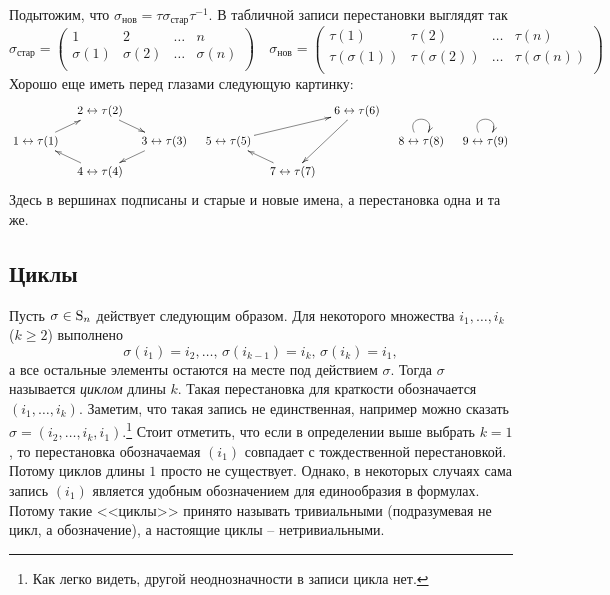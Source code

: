 Подытожим, что $\sigma_\text{нов}=\tau\sigma_\text{стар}\tau^{-1}$. В табличной записи перестановки выглядят так
\[
\sigma_\text{стар} = 
\begin{pmatrix}
{1}&{2}&{\ldots}&{n}\\
{\sigma(1)}&{\sigma(2)}&{\ldots}&{\sigma(n)}\\
\end{pmatrix}\quad
\sigma_\text{нов} = 
\begin{pmatrix}
{\tau(1)}&{\tau(2)}&{\ldots}&{\tau(n)}\\
{\tau(\sigma(1))}&{\tau(\sigma(2))}&{\ldots}&{\tau(\sigma(n))}\\
\end{pmatrix}
\]
Хорошо еще иметь перед глазами следующую картинку:
\[
\xymatrix@R=10pt@C=10pt{
	{}&{2\leftrightarrow\tau(2)}\ar[dr]&{}&{}&{}&{6\leftrightarrow\tau(6)}\ar[ddl]&{}&{}\\
	{1\leftrightarrow\tau(1)}\ar[ur]&{}&{3\leftrightarrow\tau(3)}\ar[dl]&{5\leftrightarrow\tau(5)}\ar[urr]&{}&{}&{8\leftrightarrow\tau(8)}\ar@(ul,ur)&{9\leftrightarrow\tau(9)}\ar@(ul,ur)\\
	{}&{4\leftrightarrow\tau(4)}\ar[ul]&{}&{}&{7\leftrightarrow\tau(7)}\ar[ul]&{}&{}&{}\\
}
\]
Здесь в вершинах подписаны и старые и новые имена, а перестановка одна и та же.

\subsection{Циклы}

Пусть $\sigma\in \operatorname{S}_{n}$ действует следующим образом. Для некоторого множества $i_1,\ldots,i_k$ ($k\geqslant 2$) выполнено 
\[
\sigma(i_1) = i_2,\ldots,\,\sigma(i_{k-1}) = i_k,\,\sigma(i_k) = i_1,
\]
а все остальные элементы остаются на месте под действием $\sigma$. Тогда $\sigma$ называется {\it циклом} длины $k$. Такая перестановка для краткости обозначается $(i_1,\ldots,i_k)$. Заметим, что такая запись не единственная, например можно сказать $\sigma = (i_2,\ldots,i_k,i_1)$.\footnote{Как легко видеть, другой неоднозначности в записи цикла нет.} Стоит отметить, что если в определении выше выбрать $k=1$, то перестановка обозначаемая $(i_1)$ совпадает с тождественной перестановкой. Потому циклов длины $1$ просто не существует. Однако, в некоторых случаях сама запись $(i_1)$ является удобным обозначением для единообразия в формулах. Потому такие <<циклы>> принято называть тривиальными (подразумевая не цикл, а обозначение), а настоящие циклы -- нетривиальными.


